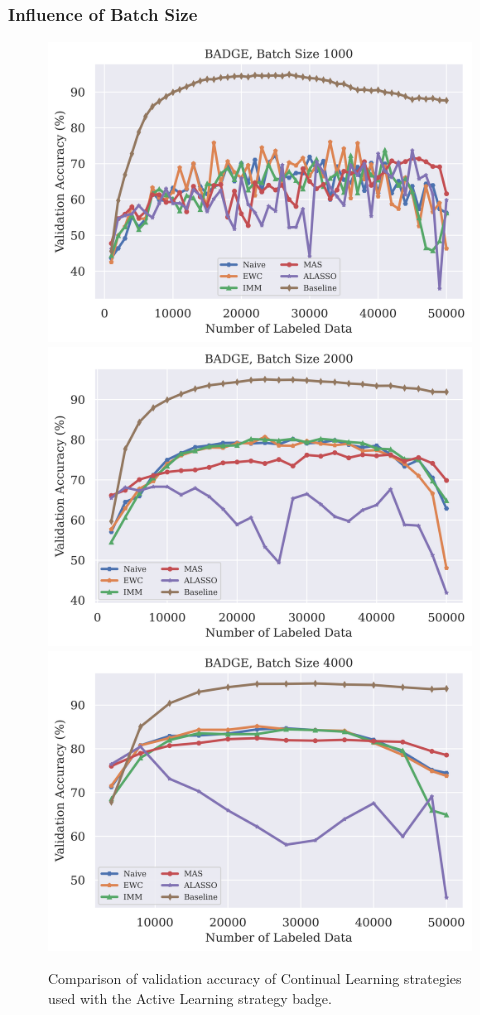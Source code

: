 \subsubsection{Influence of Batch Size}
\label{sec:Evaluation:Results:CAL:BatchSize}

\begin{figure}[h]
    \centering
    \includegraphics[width=0.32\linewidth]{images/results_CAL/badge_1000b_acc.png} \hfill
    \includegraphics[width=0.32\linewidth]{images/results_CAL/badge_2000b_acc.png} \hfill
    \includegraphics[width=0.32\linewidth]{images/results_CAL/badge_4000b_acc.png}
    \caption[Continual Active Learning with \gls{badge} with varying batch size]{Comparison of validation accuracy of Continual Learning strategies used with the Active Learning strategy
    \gls{badge}.}
    \label{fig:Evaluation:Results:CAL:VaryBatchSizeAcc}
\end{figure}

